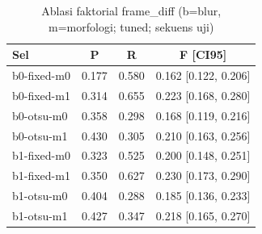 \begin{table}[t]
\centering
\caption{Ablasi faktorial frame\_diff (b=blur, m=morfologi; tuned; sekuens uji)}
\label{tab:table_ablation_cells_frame_diff}
\begin{tabular}{lccc}
\toprule
Sel & P & R & F [CI95] \\
\midrule
b0-fixed-m0 & 0.177 & 0.580 & 0.162 [0.122, 0.206] \\
b0-fixed-m1 & 0.314 & 0.655 & 0.223 [0.168, 0.280] \\
b0-otsu-m0 & 0.358 & 0.298 & 0.168 [0.119, 0.216] \\
b0-otsu-m1 & 0.430 & 0.305 & 0.210 [0.163, 0.256] \\
b1-fixed-m0 & 0.323 & 0.525 & 0.200 [0.148, 0.251] \\
b1-fixed-m1 & 0.350 & 0.627 & 0.230 [0.173, 0.290] \\
b1-otsu-m0 & 0.404 & 0.288 & 0.185 [0.136, 0.233] \\
b1-otsu-m1 & 0.427 & 0.347 & 0.218 [0.165, 0.270] \\
\bottomrule
\end{tabular}
\end{table}
